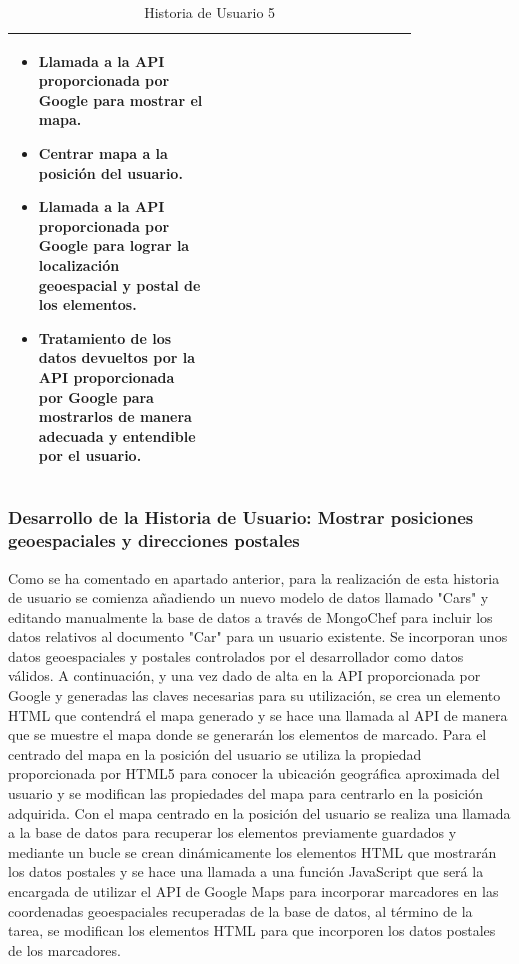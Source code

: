 \begin{table}[H]
\begin{tabular}{p{0.4\linewidth}p{0.4\linewidth}}
{\begin{minipage}{12cm}
\begin{itemize}
	    			\item Llamada a la API proporcionada por Google para mostrar el mapa.
	    			\item Centrar mapa a la posición del usuario.
	    			\item Llamada a la API proporcionada por Google para lograr la localización geoespacial y postal de los elementos.
	    			\item Tratamiento de los datos devueltos por la API proporcionada por Google para mostrarlos de manera adecuada y entendible por el usuario.
				\end{itemize}
			  	\vskip 4pt
		 	\end{minipage}
		} \\																				
	    \hline
	  \end{tabular}
	  \caption{Historia de Usuario 5}
	\end{table}
		
	\subsubsection{Desarrollo de la Historia de Usuario: Mostrar posiciones geoespaciales y direcciones postales}
	Como se ha comentado en apartado anterior, para la realización de esta historia de usuario se comienza añadiendo un nuevo modelo de datos llamado "Cars" y editando manualmente la base de datos a través de MongoChef para incluir los datos relativos al documento "Car" para un usuario existente. Se incorporan unos datos geoespaciales y postales controlados por el desarrollador como datos válidos.
	A continuación, y una vez dado de alta en la API proporcionada por Google y generadas las claves necesarias para su utilización, se crea un elemento HTML que contendrá el mapa generado y se hace una llamada al API de manera que se muestre el mapa donde se generarán los elementos de marcado. Para el centrado del mapa en la posición del usuario se utiliza la propiedad proporcionada por HTML5 para conocer la ubicación geográfica aproximada del usuario y se modifican las propiedades del mapa para centrarlo en la posición adquirida.
	Con el mapa centrado en la posición del usuario se realiza una llamada a la base de datos para recuperar los elementos previamente guardados y mediante un bucle se crean dinámicamente los elementos HTML que mostrarán los datos postales  y se hace una llamada a una función JavaScript que será la encargada de utilizar el API de Google Maps para incorporar marcadores en las coordenadas geoespaciales recuperadas de la base de datos, al término de la tarea, se modifican los elementos HTML para que incorporen los datos postales de los marcadores.
	
